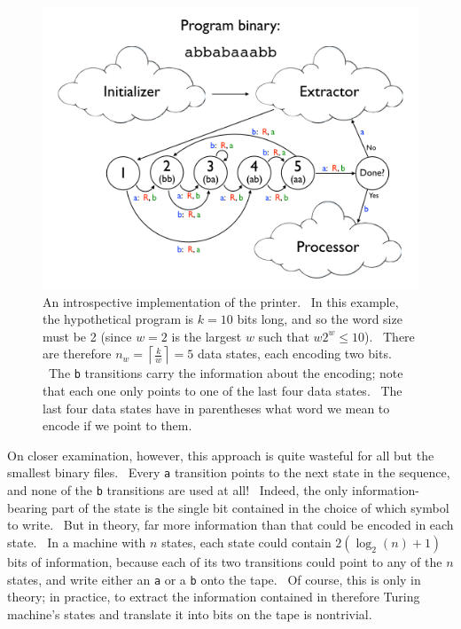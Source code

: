 \documentclass[11pt]{article}
\begin{document}
\begin{figure}
\begin{center}
\includegraphics[scale=0.28]{figs/introspectprog.png}
\caption{An introspective implementation of the printer. \ In this example, the hypothetical program is $k=10$ bits long, and so the word size must be 2 (since $w=2$ is the largest $w$ such that $w2^w \le 10$). \ There are therefore $n_w = \left \lceil{\frac{k}{w}}\right \rceil = 5$ data states, each encoding two bits. \ The \texttt{b} transitions carry the information about the encoding; note that each one only points to one of the last four data states. \ The last four data states have in parentheses what word we mean to encode if we point to them. \label{fig:introspectprog}}
\end{center}
\end{figure}

On closer examination, however, this approach is quite wasteful for all but the smallest binary files. \ Every \texttt{a} transition points to the next state in the sequence, and none of the \texttt{b} transitions are used at all! \ Indeed, the only information-bearing part of the state is the single bit contained in the choice of which symbol to write. \ But in theory, far more information than that could be encoded in each state. \ In a machine with $n$ states, each state could contain $2(\log_2(n) + 1)$ bits of information, because each of its two transitions could point to any of the $n$ states, and write either an \texttt{a} or a \texttt{b} onto the tape. \ Of course, this is only in theory; in practice, to extract the information contained in therefore Turing machine's states and translate it into bits on the tape is nontrivial.
\end{document}

